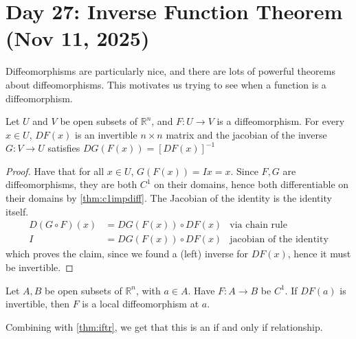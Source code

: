 \section{Day 27: Inverse Function Theorem (Nov 11, 2025)}

Diffeomorphisms are particularly nice, and there are lots of powerful theorems about diffeomorphisms. This motivates us trying to see when a function is a diffeomorphism.

\begin{simplethm} \label{thm:iftr}
    Let $U$ and $V$ be open subsets of $\mathbb{R}^n$, and $F : U \to V$ is a diffeomorphism. For every $x \in U$, $DF(x)$ is an invertible $n \times n$ matrix and the jacobian of the inverse $G : V \to U$ satisfies
    $DG(F(x)) = [DF(x)]^{-1}$
\end{simplethm}

\begin{proof}
    Have that for all $x \in U$, $G(F(x)) = Ix = x$. Since $F, G$ are diffeomorphisms, they are both $C^1$ on their domains, hence both differentiable on their domains by \ref{thm:c1impdiff}. The Jacobian of the identity is the identity itself.
    \begin{align*}
        D(G \circ F)(x) &= DG(F(x)) \circ DF(x) & \text{via chain rule} \\
        I &= DG(F(x)) \circ DF(x) & \text{jacobian of the identity}
    \end{align*}
    which proves the claim, since we found a (left) inverse for $DF(x)$, hence it must be invertible. 
\end{proof}

\begin{theorem} \label{thm:iftl}
    Let $A, B$ be open subsets of $\mathbb{R}^n$, with $a \in A$. Have $F: A \to B$ be $C^1$. If $DF(a)$ is invertible, then $F$ is a local diffeomorphism at $a$. 
\end{theorem}

\noindent Combining with \ref{thm:iftr}, we get that this is an if and only if relationship.
